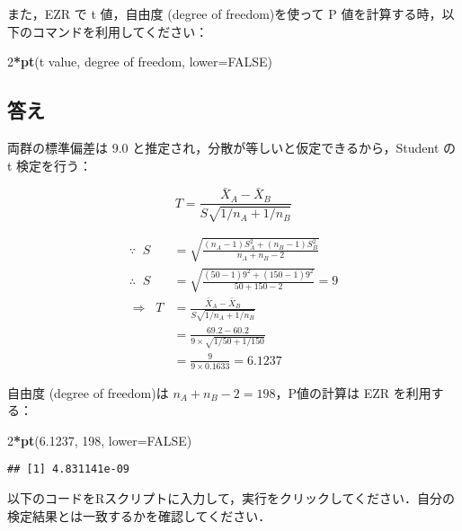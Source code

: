 \documentclass[11pt,]{problemset}
\newenvironment{Shaded}{\begin{snugshade}}{\end{snugshade}}
\newcommand{\DataTypeTok}[1]{\textcolor[rgb]{0.13,0.29,0.53}{#1}}
\newcommand{\DecValTok}[1]{\textcolor[rgb]{0.00,0.00,0.81}{#1}}
\newcommand{\FloatTok}[1]{\textcolor[rgb]{0.00,0.00,0.81}{#1}}
\newcommand{\KeywordTok}[1]{\textcolor[rgb]{0.13,0.29,0.53}{\textbf{#1}}}
\newcommand{\NormalTok}[1]{#1}
\newcommand{\OperatorTok}[1]{\textcolor[rgb]{0.81,0.36,0.00}{\textbf{#1}}}
\newcommand{\OtherTok}[1]{\textcolor[rgb]{0.56,0.35,0.01}{#1}}
\begin{document}
また，EZR で t 値，自由度 (degree of freedom)を使って P
値を計算する時，以下のコマンドを利用してください：

\begin{Shaded}
\begin{Highlighting}[]
\DecValTok{2}\OperatorTok{*}\KeywordTok{pt}\NormalTok{(t value, degree of freedom, }\DataTypeTok{lower=}\OtherTok{FALSE}\NormalTok{)}
\end{Highlighting}
\end{Shaded}

\newpage
\vfill

\subsection{答え}

両群の標準偏差は 9.0 と推定され，分散が等しいと仮定できるから，Student
の t 検定を行う：

\[
T = \frac{\bar{X}_A - \bar{X}_B}{S\sqrt{1/n_A + 1/n_B}}
\]

\[
\begin{aligned}
\because\;\;  S & = \sqrt{\frac{(n_A - 1)S^2_A + (n_B - 1)S^2_B}{n_A + n_B -2}} \\
\therefore\;\; S & =  \sqrt{\frac{(50 - 1)9^2 + (150 - 1)9^2}{50 + 150 -2}} = 9 \\
\Rightarrow\;\; T & = \frac{\bar{X}_A - \bar{X}_B}{S\sqrt{1/n_A + 1/n_B}} \\ 
                  & = \frac{69.2 - 60.2}{9\times\sqrt{1/50 + 1/150}} \\ 
                  & = \frac{9}{9\times0.1633} = 6.1237
\end{aligned}
\]

自由度 (degree of freedom)は \(n_A + n_B -2 = 198\)，P値の計算は EZR
を利用する：

\begin{Shaded}
\begin{Highlighting}[]
\DecValTok{2}\OperatorTok{*}\KeywordTok{pt}\NormalTok{(}\FloatTok{6.1237}\NormalTok{, }\DecValTok{198}\NormalTok{, }\DataTypeTok{lower=}\OtherTok{FALSE}\NormalTok{)}
\end{Highlighting}
\end{Shaded}

\begin{verbatim}
## [1] 4.831141e-09
\end{verbatim}

\bigskip
\bigskip

以下のコードをRスクリプトに入力して，実行をクリックしてください．自分の検定結果とは一致するかを確認してください．
\end{document}
